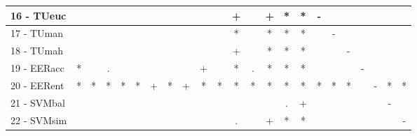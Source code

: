 \begin{table}[h]
\begin{center}
\begin{tabular}{lcc|cc|cc|cc|cc|cc|cc|cc|cc|cc|cc}
16 - TUeuc	&   &   &   &   &   &   &   &   &   &   & + &   & + & * & * & - &   &   &   &   &   &   \\ \hline
17 - TUman	&   &   &   &   &   &   &   &   &   &   & * &   & * & * & * &   & - &   &   &   &   &   \\
18 - TUmah	&   &   &   &   &   &   &   &   &   &   & + &   & * & * & * &   &   & - &   &   &   &   \\ \hline
19 - EERacc	& * &   & . &   &   &   &   &   & + &   & * & . & * & * & * &   &   &   & - &   &   &   \\
20 - EERent	& * & * & * & * & * & + & * & + & * & * & * & * & * & * & * & * & * & * &   & - & * & * \\ \hline
21 - SVMbal	&   &   &   &   &   &   &   &   &   &   &   &   &   & . & + &   &   &   &   &   & - &   \\
22 - SVMsim	&   &   &   &   &   &   &   &   &   &   & . &   & + & * & * &   &   &   &   &   &   & - \\ \hline\end{tabular}

\label{stratsfriedSVM}
\end{center}
\end{table}